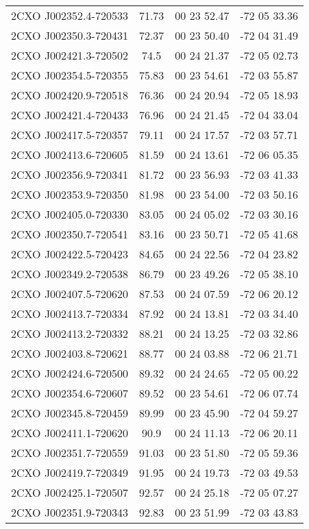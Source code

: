 \begin{table}
\begin{tabular}{cccc}
2CXO J002352.4-720533 & 71.73 & 00 23 52.47 & -72 05 33.36 \\
2CXO J002350.3-720431 & 72.37 & 00 23 50.40 & -72 04 31.49 \\
2CXO J002421.3-720502 & 74.5 & 00 24 21.37 & -72 05 02.73 \\
2CXO J002354.5-720355 & 75.83 & 00 23 54.61 & -72 03 55.87 \\
2CXO J002420.9-720518 & 76.36 & 00 24 20.94 & -72 05 18.93 \\
2CXO J002421.4-720433 & 76.96 & 00 24 21.45 & -72 04 33.04 \\
2CXO J002417.5-720357 & 79.11 & 00 24 17.57 & -72 03 57.71 \\
2CXO J002413.6-720605 & 81.59 & 00 24 13.61 & -72 06 05.35 \\
2CXO J002356.9-720341 & 81.72 & 00 23 56.93 & -72 03 41.33 \\
2CXO J002353.9-720350 & 81.98 & 00 23 54.00 & -72 03 50.16 \\
2CXO J002405.0-720330 & 83.05 & 00 24 05.02 & -72 03 30.16 \\
2CXO J002350.7-720541 & 83.16 & 00 23 50.71 & -72 05 41.68 \\
2CXO J002422.5-720423 & 84.65 & 00 24 22.56 & -72 04 23.82 \\
2CXO J002349.2-720538 & 86.79 & 00 23 49.26 & -72 05 38.10 \\
2CXO J002407.5-720620 & 87.53 & 00 24 07.59 & -72 06 20.12 \\
2CXO J002413.7-720334 & 87.92 & 00 24 13.81 & -72 03 34.40 \\
2CXO J002413.2-720332 & 88.21 & 00 24 13.25 & -72 03 32.86 \\
2CXO J002403.8-720621 & 88.77 & 00 24 03.88 & -72 06 21.71 \\
2CXO J002424.6-720500 & 89.32 & 00 24 24.65 & -72 05 00.22 \\
2CXO J002354.6-720607 & 89.52 & 00 23 54.61 & -72 06 07.74 \\
2CXO J002345.8-720459 & 89.99 & 00 23 45.90 & -72 04 59.27 \\
2CXO J002411.1-720620 & 90.9 & 00 24 11.13 & -72 06 20.11 \\
2CXO J002351.7-720559 & 91.03 & 00 23 51.80 & -72 05 59.36 \\
2CXO J002419.7-720349 & 91.95 & 00 24 19.73 & -72 03 49.53 \\
2CXO J002425.1-720507 & 92.57 & 00 24 25.18 & -72 05 07.27 \\
2CXO J002351.9-720343 & 92.83 & 00 23 51.99 & -72 03 43.83 \\

\end{tabular}
\end{table}
